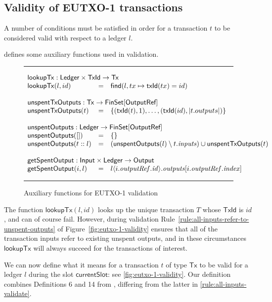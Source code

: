 \documentclass[a4paper]{article}
\newcommand{\todokwxm}[1]{\todo[inline,color=blue!20,author=kwxm]{#1}}
\newcommand{\s}{\textsf}  %
\newcommand{\msf}[1]{\ensuremath{\mathsf{#1}}}
\newcommand{\mi}[1]{\ensuremath{\mathit{#1}}}
\newcommand\rfskip{7pt}
\newenvironment{ruledfigure}[1]{\begin{figure}[#1]\hrule\vspace{\rfskip}}{\vspace{\rfskip}\hrule\end{figure}}
\newcommand{\FinSet}[1]{\ensuremath{\s{FinSet}[#1]}}
\newcommand{\TxId}{\ensuremath{\s{TxId}}}
\newcommand{\txId}{\msf{txId}}
\newcommand{\idx}{\mi{index}}
\newcommand{\inputs}{\mi{inputs}}
\newcommand{\outputs}{\mi{outputs}}
\newcommand{\outputref}{\mi{outputRef}}
\newcommand{\id}{\mi{id}}
\newcommand{\lookupTx}{\msf{lookupTx}}
\newcommand{\getSpent}{\msf{getSpentOutput}}
\newcommand{\unspent}{\msf{unspentOutputs}}
\newcommand{\txunspent}{\msf{unspentTxOutputs}}
\newcommand{\eutxotx}{\msf{Tx}}
\newcommand{\emptymap}{\ensuremath{\{\}}}
\begin{document}
\subsection{Validity of EUTXO-1 transactions}
\label{sec:eutxo-1-validity}
A number of conditions must be satisfied in order for a transaction
$t$ to be considered valid with respect to a ledger $l$.

 defines some auxiliary functions used in validation.
\begin{ruledfigure}{H}
  \begin{displaymath}
  \begin{array}{lll}
  \multicolumn{3}{l}{\lookupTx : \s{Ledger} \times \TxId \rightarrow \eutxotx{}}\\
  \lookupTx(l,id) &=& \textsf{find}(l, tx \mapsto \txId(tx) = id)\\
  \\
  \multicolumn{3}{l}{\txunspent : \eutxotx \rightarrow \FinSet{\s{OutputRef}}}\\
  \txunspent(t) &=& \{(\txId(t),1), \ldots, (\txId(id),\left|t.outputs\right|)\}\\
  \\
  \multicolumn{3}{l}{\unspent : \s{Ledger} \rightarrow \FinSet{\s{OutputRef}}}\\
  \unspent([]) &=& \emptymap \\
  \unspent(t::l) &=& (\unspent(l) \setminus t.\inputs) \cup \txunspent(t)\\
  \\
  \multicolumn{3}{l}{\getSpent : \s{Input} \times \s{Ledger} \rightarrow \s{Output}}\\
  \getSpent(i,l) &=& l\langle i.\outputref.\id \rangle.\outputs[i.\outputref.\idx]
  \end{array}
  \end{displaymath}
  \caption{Auxiliary functions for EUTXO-1 validation}
  \label{fig:validation-functions-1}
\end{ruledfigure}

\noindent The function $\lookupTx(l,id)$ looks up the unique
transaction $T$ whose $\TxId$ is $id$, and can of course
fail. However, during validation
Rule~\ref{rule:all-inputs-refer-to-unspent-outputs} of
Figure~\ref{fig:eutxo-1-validity} ensures that all of the transaction
inputs refer to existing unspent outputs, and in these circumstances
$\lookupTx$ will always succeed for the transactions of interest.

We can now define what it means for a transaction $t$ of
type $\eutxotx$ to be valid for a ledger $l$ during the slot $\msf{currentSlot}$: see
\cref{fig:eutxo-1-validity}.  Our definition combines
Definitions 6 and 14 from \citep{Zahnentferner18-UTxO}, differing from
the latter in \cref{rule:all-inputs-validate}.
\todokwxm{Check this.}
\end{document}
